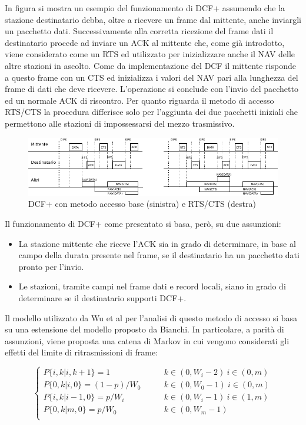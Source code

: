 In figura si mostra un esempio del funzionamento di DCF+ assumendo che la stazione destinatario debba, oltre a ricevere un frame dal mittente, anche inviargli un pacchetto dati.
Successivamente alla corretta ricezione del frame dati il destinatario procede ad inviare un ACK al mittente che, come gi\`a introdotto, viene considerato come un RTS ed utilizzato per inizializzare anche il NAV delle altre stazioni in ascolto. 
Come da implementazione del DCF il mittente risponde a questo frame con un CTS ed inizializza i valori del NAV pari alla lunghezza del frame di dati che deve ricevere.
L'operazione si conclude con l'invio del pacchetto ed un normale ACK di riscontro.
Per quanto riguarda il metodo di accesso RTS/CTS la procedura differisce solo per l'aggiunta dei due pacchetti iniziali che permettono alle stazioni di impossessarsi del mezzo trasmissivo.

\begin{figure}[!htb]
	\centering
	\includegraphics{images/img2.pdf}
	\caption{DCF+ con metodo accesso base (sinistra) e RTS/CTS (destra)}
	\label{fig:dcf+ex}
\end{figure}

Il funzionamento di DCF+ come presentato si basa, per\`o, su due assunzioni:

\begin{itemize}
	\item La stazione mittente che riceve l'ACK sia in grado di determinare, in base al campo della durata presente nel frame, se il destinatario ha un pacchetto dati pronto per l'invio.
	\item Le stazioni, tramite campi nel frame dati e record locali, siano in 		grado di determinare se il destinatario supporti DCF+.
\end{itemize}

Il modello utilizzato da Wu et al per l'analisi di questo metodo di accesso si basa su una estensione del modello proposto da Bianchi.
In particolare, a parit\`a di assunzioni, viene proposta una catena di Markov in cui vengono considerati gli effetti del limite di ritrasmissioni di frame:

$$
\begin{cases}
  P \{ i, k| i, k + 1\}  =1 	 &\qquad k \in (0, W_{i}-2) \ i \in (0,m) \\ 
  P \{ 0, k| i, 0\}  =(1-p)/W_{0} 	 &\qquad k \in (0, W_{0}-1) \ i \in (0,m) \\ 
  P \{ i, k| i-1, 0\}  =p/W_{i} 	 &\qquad k \in (0, W_{i}-1) \ i \in (1,m) \\ 
  P \{ 0, k| m, 0\}  =p/W_{0} 	 &\qquad k \in (0, W_{m}-1) \\
\end{cases}
$$

